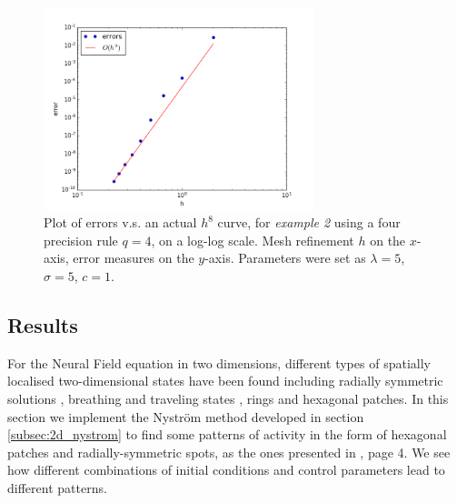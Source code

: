 \documentclass{uonmathreport}
\begin{document}
\begin{figure}[H]
	\begin{center}
		\includegraphics[width=0.7\textwidth]{Figures/2dRectTest2_q=4_case3.png}
	\end{center}
	\caption{Plot of errors v.s. an actual $h^8$ curve, for \textit{example 2} using a four precision rule $q=4$, on a log-log scale. Mesh refinement $h$ on the $x$-axis, error measures on the $y$-axis. Parameters were set as $\lambda=5$, $\sigma=5$, $c=1$.}
	\label{fig:2dErrors_test2_q4_case3}
\end{figure}

\subsection{Results} \label{subsec:2d_results}
For the Neural Field equation in two dimensions, different types of spatially localised two-dimensional states have been found including radially symmetric solutions \cite{laing2003pde,LaingCarloR.2002MBia}, breathing and traveling states \cite{coombes2014spots,owen2007bumps}, rings \cite{coombes2012interface,owen2007bumps} and hexagonal patches\cite{laing2003pde,rankin2014continuation}. In this section we implement the Nystr\"om method developed in section \ref{subsec:2d_nystrom} to find some patterns of activity in the form of hexagonal patches and radially-symmetric spots, as the ones presented in \cite{rankin2014continuation}, page 4. We see how different combinations of initial conditions and control parameters lead to different patterns.
\end{document}
